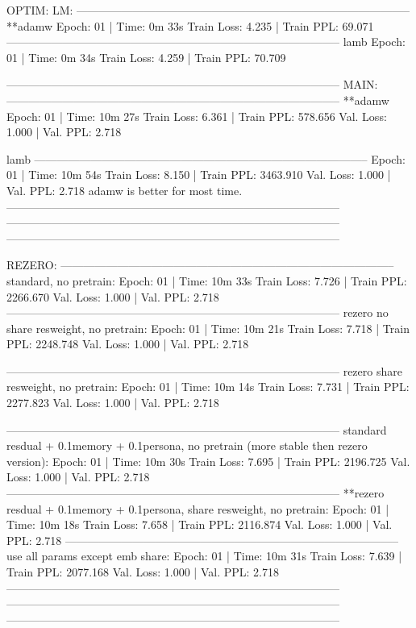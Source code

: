 \documentclass[letterpaper]{article} %
\begin{document}
\begin{CJK*}{UTF8}{gbsn}
OPTIM:
LM:
-----------------------------------------------------------------------------------------
**adamw
 Epoch: 01 | Time: 0m 33s
	Train Loss: 4.235 | Train PPL:  69.071
-----------------------------------------------------------------------------------------
lamb
 Epoch: 01 | Time: 0m 34s
	Train Loss: 4.259 | Train PPL:  70.709

-----------------------------------------------------------------------------------------
MAIN:
-----------------------------------------------------------------------------------------
**adamw
Epoch: 01 | Time: 10m 27s
    Train Loss: 6.361 | Train PPL: 578.656
         Val. Loss: 1.000 |  Val. PPL:   2.718

lamb
-----------------------------------------------------------------------------------------
Epoch: 01 | Time: 10m 54s
	Train Loss: 8.150 | Train PPL: 3463.910
	 Val. Loss: 1.000 |  Val. PPL:   2.718
adamw is better for most time.
-----------------------------------------------------------------------------------------
-----------------------------------------------------------------------------------------
-----------------------------------------------------------------------------------------

REZERO:
-----------------------------------------------------------------------------------------
standard, no pretrain:
Epoch: 01 | Time: 10m 33s
	Train Loss: 7.726 | Train PPL: 2266.670
	 Val. Loss: 1.000 |  Val. PPL:   2.718
-----------------------------------------------------------------------------------------
rezero no share resweight, no pretrain:
Epoch: 01 | Time: 10m 21s
	Train Loss: 7.718 | Train PPL: 2248.748
	 Val. Loss: 1.000 |  Val. PPL:   2.718

-----------------------------------------------------------------------------------------
rezero share resweight, no pretrain:
Epoch: 01 | Time: 10m 14s
	Train Loss: 7.731 | Train PPL: 2277.823
	 Val. Loss: 1.000 |  Val. PPL:   2.718

-----------------------------------------------------------------------------------------
standard resdual + 0.1memory + 0.1persona, no pretrain (more stable then rezero version):
Epoch: 01 | Time: 10m 30s
	Train Loss: 7.695 | Train PPL: 2196.725
	 Val. Loss: 1.000 |  Val. PPL:   2.718
-----------------------------------------------------------------------------------------
**rezero resdual + 0.1memory + 0.1persona, share resweight, no pretrain:
Epoch: 01 | Time: 10m 18s
	Train Loss: 7.658 | Train PPL: 2116.874
	 Val. Loss: 1.000 |  Val. PPL:   2.718
-----------------------------------------------------------------------------------------
use all params except emb share:
Epoch: 01 | Time: 10m 31s
	Train Loss: 7.639 | Train PPL: 2077.168
	 Val. Loss: 1.000 |  Val. PPL:   2.718
-----------------------------------------------------------------------------------------
-----------------------------------------------------------------------------------------
-----------------------------------------------------------------------------------------


\end{CJK*}
\end{document}
